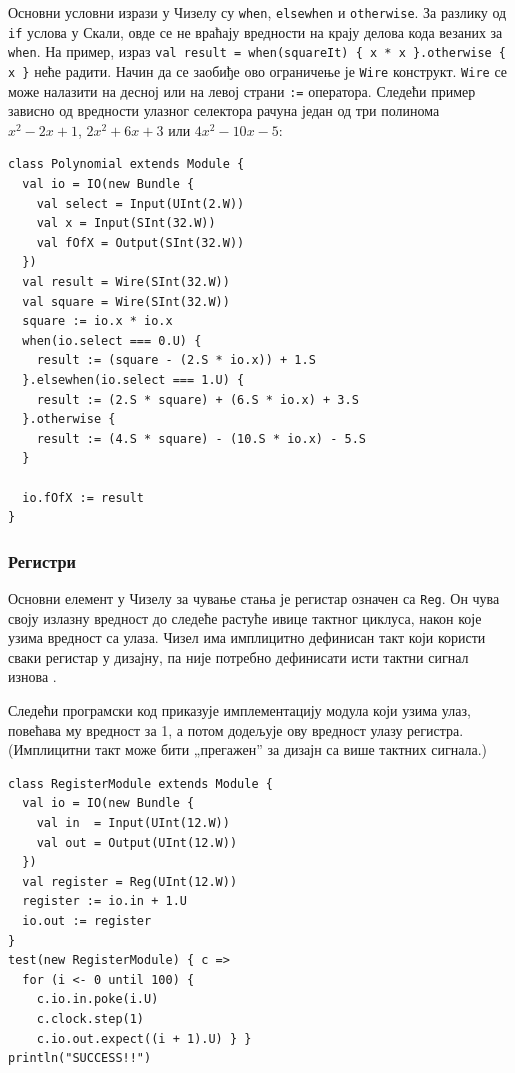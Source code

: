 \documentclass[12pt, a4paper]{article}
\theoremstyle{definition}
\begin{document}
Основни условни изрази у Чизелу су \verb+when+, \verb+elsewhen+ и \verb+otherwise+. За разлику од \verb+if+ услова у Скали, овде се не враћају вредности на крају делова кода везаних за \verb+when+. На пример, израз \verb+val result = when(squareIt) { x * x }.otherwise { x }+ неће радити. Начин да се заобиђе ово ограничење је \verb+Wire+ конструкт. \verb+Wire+ се може налазити на десној или на левој страни \verb+:=+ оператора. Следећи пример зависно од вредности улазног селектора рачуна један од три полинома $x^2 - 2x + 1$, $2x^2 + 6x + 3$ или $4x^2 - 10x - 5$:
\begin{verbatim}
class Polynomial extends Module {
  val io = IO(new Bundle {
    val select = Input(UInt(2.W))
    val x = Input(SInt(32.W))
    val fOfX = Output(SInt(32.W))
  })
  val result = Wire(SInt(32.W))
  val square = Wire(SInt(32.W))
  square := io.x * io.x
  when(io.select === 0.U) {
    result := (square - (2.S * io.x)) + 1.S
  }.elsewhen(io.select === 1.U) {
    result := (2.S * square) + (6.S * io.x) + 3.S
  }.otherwise {
    result := (4.S * square) - (10.S * io.x) - 5.S
  }

  io.fOfX := result
}
\end{verbatim}

\subsubsection{Регистри}
Основни елемент у Чизелу за чување стања је регистар означен са \verb+Reg+. Он чува своју излазну вредност до следеће растуће ивице тактног циклуса, након које узима вредност са улаза. Чизел има имплицитно дефинисан такт који користи сваки регистар у дизајну, па није потребно дефинисати исти тактни сигнал изнова \cite{git_chisel}.

Следећи програмски код приказује имплементацију модула који узима улаз, повећава му вредност за 1, а потом додељује ову вредност улазу регистра. (Имплицитни такт може бити „прегажен” за дизајн са више тактних сигнала.)
\begin{verbatim}
class RegisterModule extends Module {
  val io = IO(new Bundle {
    val in  = Input(UInt(12.W))
    val out = Output(UInt(12.W))
  })
  val register = Reg(UInt(12.W))
  register := io.in + 1.U
  io.out := register
}
test(new RegisterModule) { c =>
  for (i <- 0 until 100) {
    c.io.in.poke(i.U)
    c.clock.step(1)
    c.io.out.expect((i + 1).U) } }
println("SUCCESS!!")
\end{verbatim}
\end{document}
